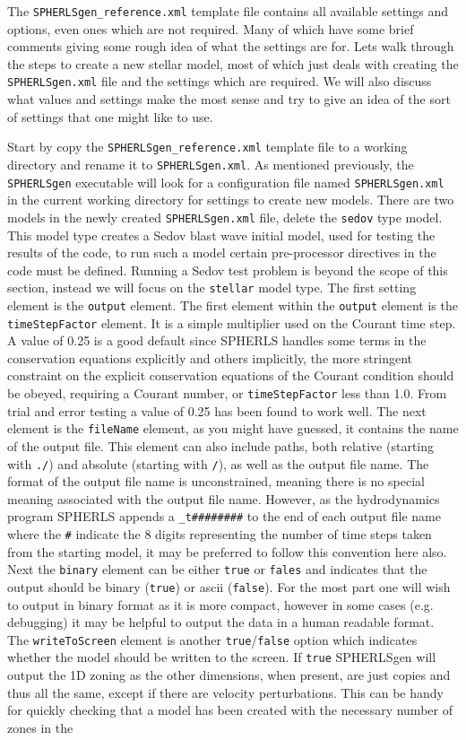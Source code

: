 \documentclass[12pt,a4paper]{book}
\begin{document}
The {\tt SPHERLSgen\_reference.xml} template file contains all available settings and options, even ones which are not required. Many of which have some brief comments giving some rough idea of what the settings are for. Lets walk through the steps to create a new stellar model, most of which just deals with creating the {\tt SPHERLSgen.xml} file and the settings which are required. We will also discuss what values and settings make the most sense and try to give an idea of the sort of settings that one might like to use.

Start by copy the {\tt SPHERLSgen\_reference.xml} template file to a working directory and rename it to {\tt SPHERLSgen.xml}. As mentioned previously, the {\tt SPHERLSgen} executable will look for a configuration file named {\tt SPHERLSgen.xml} in the current working directory for settings to create new models. There are two models in the newly created {\tt SPHERLSgen.xml} file, delete the {\tt sedov} type model. This  model type creates a Sedov blast wave initial model, used for testing the results of the code, to run such a model certain pre-processor directives in the code must be defined. Running a Sedov test problem is beyond the scope of this section, instead we will focus on the {\tt stellar} model type. The first setting element is the {\tt output} element. The first element within the {\tt output} element is the {\tt timeStepFactor} element. It is a simple multiplier used on the Courant time step. A value of 0.25 is a good default since SPHERLS handles some terms in the conservation equations explicitly and others implicitly, the more stringent constraint on the explicit conservation equations of the Courant condition should be obeyed, requiring a Courant number, or {\tt timeStepFactor} less than 1.0. From trial and error testing a value of 0.25 has been found to work well. The next element is the {\tt fileName} element, as you might have guessed, it contains the name of the output file. This element can also include paths, both relative (starting with {\tt ./}) and absolute (starting with {\tt /}), as well as the output file name. The format of the output file name is unconstrained, meaning there is no special meaning associated with the output file name. However, as the hydrodynamics program SPHERLS appends a {\tt \_t\#\#\#\#\#\#\#\#} to the end of each output file name where the {\tt \#} indicate the 8 digits representing the number of time steps taken from the starting model, it may be preferred to follow this convention here also. Next the {\tt binary} element can be either {\tt true} or {\tt fales} and indicates that the output should be binary ({\tt true}) or ascii ({\tt false}). For the most part one will wish to output in binary format as it is more compact, however in some cases (e.g. debugging) it may be helpful to output the data in a human readable format. The {\tt writeToScreen} element is another {\tt true}/{\tt false} option which indicates whether the model should be written to the screen. If {\tt true} SPHERLSgen will output the 1D zoning as the other dimensions, when present, are just copies and thus all the same, except if there are velocity perturbations. This can be handy for quickly checking that a model has been created with the necessary number of zones in the 
\end{document}
